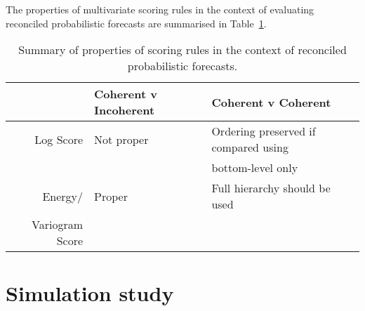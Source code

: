 \documentclass[a4paper, 11pt]{article}
\def\E{\text{E}}
\theoremstyle{definition}
\begin{document}
The properties of multivariate scoring rules in the context of evaluating reconciled probabilistic forecasts are summarised in Table~\ref{tab:prop}.

\begin{table}
	\centering
	\begin{tabular}{rll}
	& Coherent v Incoherent &Coherent v Coherent\\
	\hline
	Log Score & Not proper & Ordering preserved if compared using\\ &&bottom-level only\\
	Energy/ & Proper & Full hierarchy should be used\\
	Variogram Score & &\\
	\hline
    \end{tabular}
	\caption{Summary of properties of scoring rules in the context of reconciled probabilistic forecasts.}
	\label{tab:prop}
\end{table}

%
%

\section{Simulation study}\label{sec:gaussian}
\end{document}
